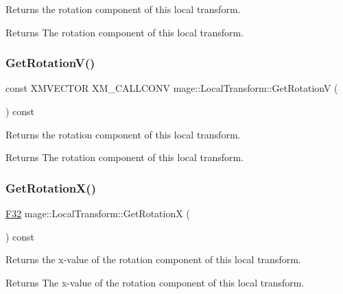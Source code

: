 Returns the rotation component of this local transform.

\begin{DoxyReturn}{Returns}
The rotation component of this local transform. 
\end{DoxyReturn}
\hypertarget{classmage_1_1_local_transform_a489f350ed2e1e7eea1d168502cd03e88}{}\label{classmage_1_1_local_transform_a489f350ed2e1e7eea1d168502cd03e88} 
\subsubsection{\texorpdfstring{Get\+Rotation\+V()}{GetRotationV()}}
{\footnotesize\ttfamily const X\+M\+V\+E\+C\+T\+OR X\+M\+\_\+\+C\+A\+L\+L\+C\+O\+NV mage\+::\+Local\+Transform\+::\+Get\+RotationV (\begin{DoxyParamCaption}{ }\end{DoxyParamCaption}) const\hspace{0.3cm}{\ttfamily [noexcept]}}

Returns the rotation component of this local transform.

\begin{DoxyReturn}{Returns}
The rotation component of this local transform. 
\end{DoxyReturn}
\hypertarget{classmage_1_1_local_transform_af60f86fbaa2dc4562d67100215a63a61}{}\label{classmage_1_1_local_transform_af60f86fbaa2dc4562d67100215a63a61} 
\subsubsection{\texorpdfstring{Get\+Rotation\+X()}{GetRotationX()}}
{\footnotesize\ttfamily \hyperlink{namespacemage_aa97e833b45f06d60a0a9c4fc22ae02c0}{F32} mage\+::\+Local\+Transform\+::\+Get\+RotationX (\begin{DoxyParamCaption}{ }\end{DoxyParamCaption}) const\hspace{0.3cm}{\ttfamily [noexcept]}}

Returns the x-\/value of the rotation component of this local transform.

\begin{DoxyReturn}{Returns}
The x-\/value of the rotation component of this local transform. 
\end{DoxyReturn}
\hypertarget{classmage_1_1_local_transform_a7d6b4eba97d85e80dacb6dc663c17e9c}{}\label{classmage_1_1_local_transform_a7d6b4eba97d85e80dacb6dc663c17e9c} 
